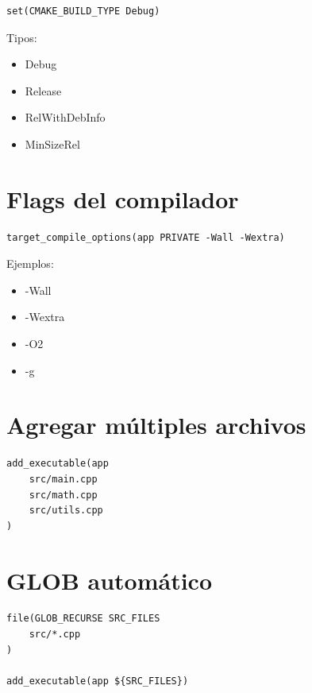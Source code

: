 \documentclass[a4paper,11pt]{article}
\begin{document}
\begin{lstlisting}
set(CMAKE_BUILD_TYPE Debug)
\end{lstlisting}

Tipos:
\begin{itemize}
    \item Debug
    \item Release
    \item RelWithDebInfo
    \item MinSizeRel
\end{itemize}


\section*{Flags del compilador}

\begin{lstlisting}
target_compile_options(app PRIVATE -Wall -Wextra)
\end{lstlisting}

Ejemplos:
\begin{itemize}
    \item -Wall
    \item -Wextra
    \item -O2
    \item -g
\end{itemize}


\section*{Agregar múltiples archivos}

\begin{lstlisting}
add_executable(app
    src/main.cpp
    src/math.cpp
    src/utils.cpp
)
\end{lstlisting}


\section*{GLOB automático}

\begin{lstlisting}
file(GLOB_RECURSE SRC_FILES
    src/*.cpp
)

add_executable(app ${SRC_FILES})
\end{lstlisting}
\end{document}
